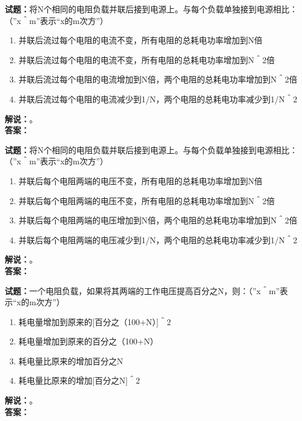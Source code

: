 \documentclass{ctexbook}
\begin{document}
\vspace{\baselineskip}

\noindent\textbf{试题：}将N个相同的电阻负载并联后接到电源上。与每个负载单独接到电源相比：（”x＾m”表示“x的m次方”）
\begin{enumerate}[leftmargin=3em]
  \item 并联后流过每个电阻的电流不变，所有电阻的总耗电功率增加到N倍
  \item 并联后流过每个电阻的电流不变，所有电阻的总耗电功率增加到N＾2倍
  \item 并联后流过每个电阻的电流增加到N倍，两个电阻的总耗电功率增加到N＾2倍
  \item 并联后流过每个电阻的电流减少到1/N，两个电阻的总耗电功率减少到1/N＾2
\end{enumerate}
\noindent\textbf{解说：}\textbf{}。\\\noindent\textbf{答案：}

\vspace{\baselineskip}

\noindent\textbf{试题：}将N个相同的电阻负载并联后接到电源上。与每个负载单独接到电源相比：（”x＾m”表示“x的m次方”）
\begin{enumerate}[leftmargin=3em]
  \item 并联后每个电阻两端的电压不变，所有电阻的总耗电功率增加到N倍
  \item 并联后每个电阻两端的电压不变，所有电阻的总耗电功率增加到N＾2倍
  \item 并联后每个电阻两端的电压增加到N倍，两个电阻的总耗电功率增加到N＾2倍
  \item 并联后每个电阻两端的电压减少到1/N，两个电阻的总耗电功率减少到1/N＾2
\end{enumerate}
\noindent\textbf{解说：}\textbf{}。\\\noindent\textbf{答案：}

\vspace{\baselineskip}

\noindent\textbf{试题：}一个电阻负载，如果将其两端的工作电压提高百分之N，则：（”x＾m”表示“x的m次方”）
\begin{enumerate}[leftmargin=3em]
  \item 耗电量增加到原来的[百分之（100+N）]＾2
  \item 耗电量增加到原来的百分之（100+N）
  \item 耗电量比原来的增加百分之N
  \item 耗电量比原来的增加[百分之N]＾2
\end{enumerate}
\noindent\textbf{解说：}\textbf{}。\\\noindent\textbf{答案：}
\end{document}
